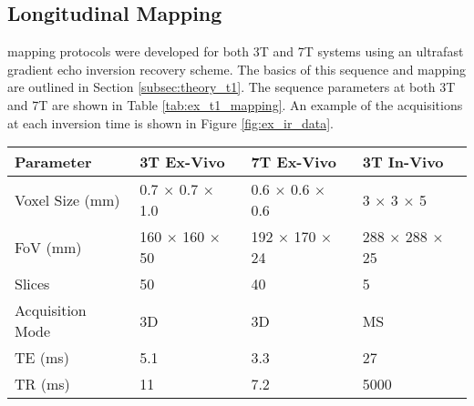 \subsection{Longitudinal \tone Mapping}
\tone mapping protocols were developed for both 3T and 7T systems using an ultrafast gradient echo inversion recovery scheme. The basics of this sequence and \tone mapping are outlined in Section \ref{subsec:theory_t1}. The sequence parameters at both 3T and 7T are shown in Table \ref{tab:ex_t1_mapping}. An example of the acquisitions at each inversion time is shown in Figure \ref{fig:ex_ir_data}.

\begin{table}[H]
	\centering
	\begin{tabularx}{1.0\textwidth}{X|X|X|X}
		\textbf{Parameter}                        & \textbf{3T Ex-Vivo}                                & \textbf{7T Ex-Vivo}                                & \textbf{3T In-Vivo}                                                \\ \hline
		Voxel Size (mm)                           & 0.7 $\times$ 0.7 $\times$ 1.0                                    & 0.6 $\times$ 0.6 $\times$ 0.6                                    & 3 $\times$ 3 $\times$ 5                                                          \\ \hline
		FoV (mm)                                  & 160 $\times$ 160 $\times$ 50                                     & 192 $\times$ 170 $\times$ 24                                     & 288 $\times$ 288 $\times$ 25                                                     \\ \hline
		Slices                                    & 50                                                 & 40                                                 & 5                                                                  \\ \hline
		Acquisition Mode                          & 3D                                                 & 3D                                                 & MS                                                                 \\ \hline
		TE (ms)                                   & 5.1                                                & 3.3                                                & 27                                                                 \\ \hline
		TR (ms)                                   & 11                                                 & 7.2                                                & 5000                                                               \\ \hline

\end{tabularx}
\end{table}
